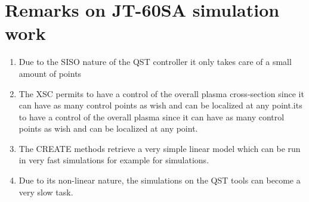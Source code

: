 \section{Remarks on JT-60SA simulation work}
\begin{enumerate}
	\item   Due to the SISO nature of the QST controller it only takes care of a small amount of points 
	\smallskip
	
	\item The XSC permits to have a control of the overall plasma cross-section since it can have as many control points as wish and can be localized at any point.its to have a control of the overall plasma since it can have as many control points as wish and can be localized at any point.
\smallskip
	
	\item The CREATE methods retrieve a very simple linear model which can be run in very fast simulations for example for simulations.\smallskip
	
	
	\item  Due to its non-linear nature, the simulations on the QST tools can become a very slow task.
\end{enumerate}




